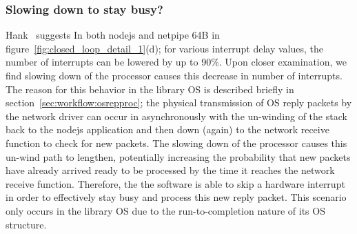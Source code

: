 \subsubsection{Slowing down to stay busy?}
\label{sec:closed_loop:slowtostaybusy}
Hank~\cite{pacingtoidle} suggests  In both nodejs and netpipe 64B in figure~\ref{fig:closed_loop_detail_1}(d); for various interrupt delay values, the number of interrupts can be lowered by up to 90\%. Upon closer examination, we find slowing down of the processor causes this decrease in number of interrupts. The reason for this behavior in the library OS is described briefly in section~\ref{sec:workflow:osrepproc}; the physical transmission of OS reply packets by the network driver can occur in asynchronously with the un-winding of the stack back to the nodejs application and then down (again) to the network receive function to check for new packets. The slowing down of the processor causes this un-wind path to lengthen, potentially increasing the probability that new packets have already arrived ready to be processed by the time it reaches the network receive function. Therefore, the the software is able to skip a hardware interrupt in order to effectively stay busy and process this new reply packet. This scenario only occurs in the library OS due to the run-to-completion nature of its OS structure.




